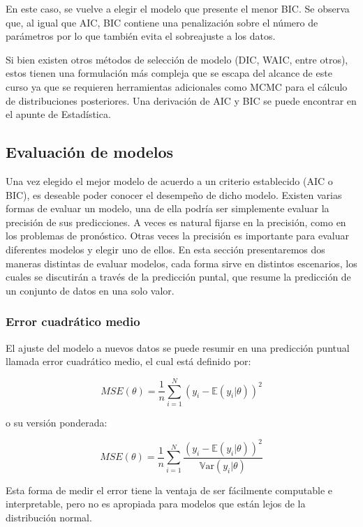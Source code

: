 En este caso, se vuelve a elegir el modelo que presente el menor BIC. Se observa que, al igual que AIC, BIC contiene una penalización sobre el número de parámetros por lo que también evita el sobreajuste a los datos.

Si bien existen otros métodos de selección de modelo (DIC, WAIC, entre otros), estos tienen una formulación más compleja que se escapa del alcance de este curso ya que se requieren herramientas adicionales como MCMC para el cálculo de distribuciones posteriores. Una derivación de AIC y BIC se puede encontrar en el apunte de Estadística.

\subsection{Evaluación de modelos}
Una vez elegido el mejor modelo de acuerdo a un criterio establecido (AIC o BIC), es deseable poder conocer el desempeño de dicho modelo. Existen varias formas de evaluar un modelo, una de ella podría ser simplemente evaluar la precisión de sus predicciones. A veces es natural fijarse en la precisión, como en los problemas de pronóstico. Otras veces la precisión es importante para evaluar diferentes modelos y elegir uno de ellos. En esta sección presentaremos dos maneras distintas de evaluar modelos, cada forma sirve en distintos escenarios, los cuales se discutirán a través de la predicción puntal, que resume la predicción de un conjunto de datos en una solo valor.

\subsubsection{Error cuadrático medio}

El ajuste del modelo a nuevos datos se puede resumir en una predicción puntual llamada error cuadrático medio, el cual está definido por:

\begin{equation}
MSE(\theta) = \frac{1}{n}\sum_{i=1}^N (y_i-\mathbb{E}(y_i|\theta))^2
\end{equation}

o su versión ponderada:

\begin{equation}
MSE(\theta) = \frac{1}{n}\sum_{i=1}^N \frac{(y_i-\mathbb{E}(y_i|\theta))^2}{\mathbb{V}\text{ar}(y_i|\theta)}
\end{equation}

Esta forma de medir el error tiene la ventaja de ser fácilmente computable e interpretable, pero no es apropiada para modelos que están lejos de la distribución normal.

